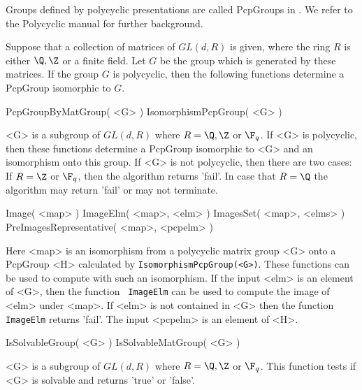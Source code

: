 
\label{section_present}
 
Groups defined by polycyclic presentations are called PcpGroups in
{\GAP}.
We refer to the Polycyclic manual \cite{polycyclic} for further
background.

Suppose that a collection of
matrices of $GL(d,R)$ is given, where the ring $R$ 
is either $\Q,\Z$ or a finite field.  Let $G$ be the group which is
generated by these matrices. If the group $G$ is polycyclic, then the
following functions determine a PcpGroup isomorphic to $G$.
 
\> PcpGroupByMatGroup( <G> )
\> IsomorphismPcpGroup( <G> )
 
<G> is  a subgroup of $GL(d,R)$ where $R=\Q,\Z $ or $\F_q$.
If <G> is polycyclic, then 
these functions determine a PcpGroup isomorphic to <G> and an isomorphism
onto this group. 
If <G> is not polycyclic, then there are two cases: If $R=\Z$ or $\F_q$,
then the algorithm returns 'fail'. In case that $R=\Q$ the algorithm may
return 'fail' or may not terminate.

\> Image( <map> ) 
\> ImageElm( <map>, <elm> )
\> ImagesSet( <map>, <elms> )
\> PreImagesRepresentative( <map>, <pcpelm> )
 
Here <map> is an isomorphism from a polycyclic matrix group <G>
onto a PcpGroup <H> calculated
by {\tt IsomorphismPcpGroup(<G>)}.
These functions can be used to compute with such an isomorphism. 
If the input <elm>  is an element of <G>, then the function {\tt
ImageElm} can be used to compute the image of <elm> under <map>. 
If <elm> is not contained in <G>
then the function {\tt ImageElm} returns 'fail'. 
The input <pcpelm> is an element
of <H>. 

\> IsSolvableGroup( <G> )
\> IsSolvableMatGroup( <G> )

<G> is  a subgroup of $GL(d,R)$ where $R=\Q,\Z $ or $\F_q$.
This function tests if <G> is
solvable and returns 'true' or 'false'. 

